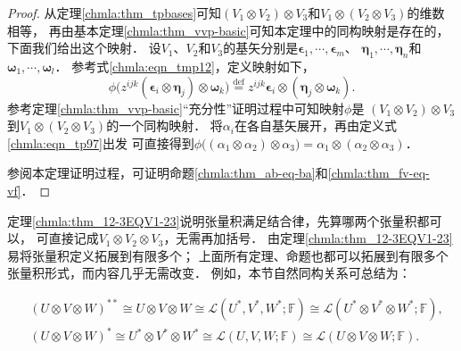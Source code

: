 \begin{proof}
    从定理\ref{chmla:thm_tpbases}可知$(V_1 \otimes V_2) \otimes V_3$和$V_1 \otimes (V_2 \otimes V_3)$的维数相等，
    再由基本定理\ref{chmla:thm_vvp-basic}可知本定理中的同构映射是存在的，下面我们给出这个映射．
    设$V_1$、$V_2$和$V_3$的基矢分别是$\boldsymbol{\epsilon}_1, \cdots, \boldsymbol{\epsilon}_m$、
    $\boldsymbol{\eta}_1, \cdots, \boldsymbol{\eta}_n$和$\boldsymbol{\omega}_1, \cdots, \boldsymbol{\omega}_l$．
    参考式\eqref{chmla:eqn_tmp12}，定义映射如下，
    \begin{equation}\label{chmla:eqn_tp97}
        \phi\bigl(z^{ijk} (\boldsymbol{\epsilon}_i\otimes\boldsymbol{\eta}_j)\otimes \boldsymbol{\omega}_k \bigr)
        \overset{\mathrm {def}}{=}
        z^{ijk} \boldsymbol{\epsilon}_i\otimes (\boldsymbol{\eta}_j\otimes \boldsymbol{\omega}_k ) .
    \end{equation}
    参考定理\ref{chmla:thm_vvp-basic}“充分性”证明过程中可知映射$\phi$是
    $(V_1 \otimes V_2) \otimes V_3$到$V_1 \otimes (V_2 \otimes V_3)$的一个同构映射．
    将$\alpha_i$在各自基矢展开，再由定义式\eqref{chmla:eqn_tp97}出发
    可直接得到$\phi\bigl((\alpha_1 \otimes \alpha_2) \otimes \alpha_3\bigr)
    = \alpha_1 \otimes (\alpha_2 \otimes \alpha_3)$．

    参阅本定理证明过程，可证明命题\ref{chmla:thm_ab-eq-ba}和\ref{chmla:thm_fv-eq-vf}．
\end{proof}
定理\ref{chmla:thm_12-3EQV1-23}说明张量积满足结合律，先算哪两个张量积都可以，
可直接记成$V_1 \otimes V_2 \otimes V_3$，无需再加括号．
由定理\ref{chmla:thm_12-3EQV1-23}易将张量积定义拓展到有限多个；
上面所有定理、命题也都可以拓展到有限多个张量积形式，而内容几乎无需改变．
例如，本节自然同构关系可总结为： 
\begin{small}
\begin{subequations} \label{chmla:lpcong}
    \begin{align}
        &(U\otimes V\otimes W)^{**}  \cong  U\otimes V\otimes W \cong
          \mathscr{L}(U^*,V^*, W^*;\mathbb{F})    \cong
          \mathscr{L}(U^*\! \otimes\! V^*\! \otimes \! W^*;\! \mathbb{F}),  \\
        &(U\otimes V\otimes W)^*  \cong  U^*\otimes V^* \otimes W^*\cong
          \mathscr{L}(U,V,W;\mathbb{F}) \cong
          \mathscr{L}(U\otimes V\otimes W;\mathbb{F}) . 
    \end{align}
\end{subequations} 
\end{small}


